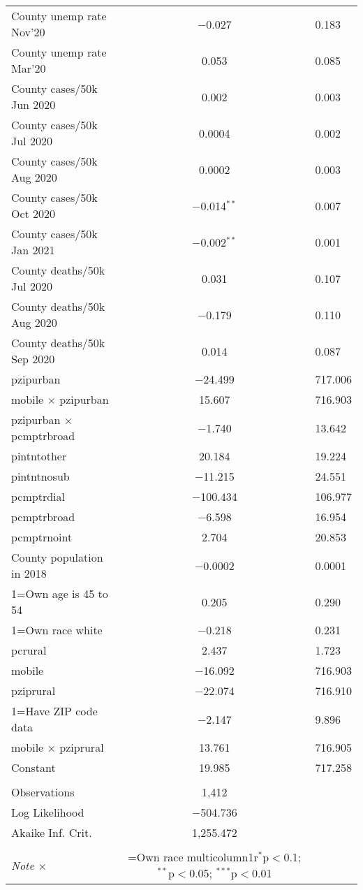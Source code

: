 \begin{table}[!htbp]
\begin{tabular}{@{\extracolsep{5pt}}lc}
  County unemp rate Nov'20 & $-$0.027 & 0.183 \\ 
  County unemp rate Mar'20 & 0.053 & 0.085 \\ 
  County cases/50k Jun 2020 & 0.002 & 0.003 \\ 
  County cases/50k Jul 2020 & 0.0004 & 0.002 \\ 
  County cases/50k Aug 2020 & 0.0002 & 0.003 \\ 
  County cases/50k Oct 2020 & $-$0.014$^{**}$ & 0.007 \\ 
  County cases/50k Jan 2021 & $-$0.002$^{**}$ & 0.001 \\ 
  County deaths/50k Jul 2020 & 0.031 & 0.107 \\ 
  County deaths/50k Aug 2020 & $-$0.179 & 0.110 \\ 
  County deaths/50k Sep 2020 & 0.014 & 0.087 \\ 
  pzipurban & $-$24.499 & 717.006 \\ 
  mobile $\times$ pzipurban & 15.607 & 716.903 \\ 
  pzipurban $\times$ pcmptrbroad & $-$1.740 & 13.642 \\ 
  pintntother & 20.184 & 19.224 \\ 
  pintntnosub & $-$11.215 & 24.551 \\ 
  pcmptrdial & $-$100.434 & 106.977 \\ 
  pcmptrbroad & $-$6.598 & 16.954 \\ 
  pcmptrnoint & 2.704 & 20.853 \\ 
  County population in 2018 & $-$0.0002 & 0.0001 \\ 
  1=Own age is 45 to 54 & 0.205 & 0.290 \\ 
  1=Own race white & $-$0.218 & 0.231 \\ 
  pcrural & 2.437 & 1.723 \\ 
  mobile & $-$16.092 & 716.903 \\ 
  pziprural & $-$22.074 & 716.910 \\ 
  1=Have ZIP code data & $-$2.147 & 9.896 \\ 
  mobile $\times$ pziprural & 13.761 & 716.905 \\ 
  Constant & 19.985 & 717.258 \\ 
 \hline \\[-1.8ex] 
Observations & 1,412 \\ 
Log Likelihood & $-$504.736 \\ 
Akaike Inf. Crit. & 1,255.472 \\ 
\hline 
\hline \\[-1.8ex] 
\textit{Note $\times$ }  & \1=Own race multicolumn{1}{r}{$^{*}$p$<$0.1; $^{**}$p$<$0.05; $^{***}$p$<$0.01} \\ 
\end{tabular} 
\end{table} 
